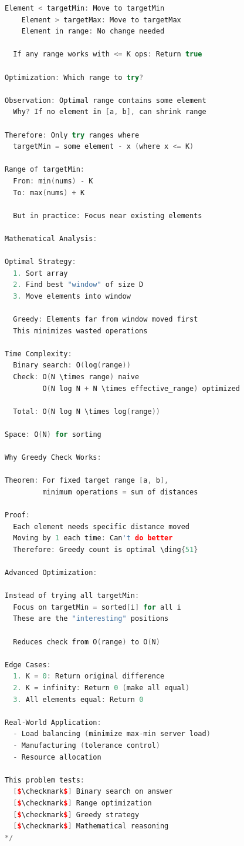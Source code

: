 \documentclass[11pt,a4paper,oneside]{book}
\begin{document}
\begin{lstlisting}[language=C++, caption=ELITE Problem 1 - Multi-Dimensional Binary Search]
    Element < targetMin: Move to targetMin
    Element > targetMax: Move to targetMax
    Element in range: No change needed
  
  If any range works with <= K ops: Return true

Optimization: Which range to try?

Observation: Optimal range contains some element
  Why? If no element in [a, b], can shrink range
  
Therefore: Only try ranges where
  targetMin = some element - x (where x <= K)

Range of targetMin:
  From: min(nums) - K
  To: max(nums) + K
  
  But in practice: Focus near existing elements

Mathematical Analysis:

Optimal Strategy:
  1. Sort array
  2. Find best "window" of size D
  3. Move elements into window
  
  Greedy: Elements far from window moved first
  This minimizes wasted operations

Time Complexity:
  Binary search: O(log(range))
  Check: O(N \times range) naive
         O(N log N + N \times effective_range) optimized
  
  Total: O(N log N \times log(range))

Space: O(N) for sorting

Why Greedy Check Works:

Theorem: For fixed target range [a, b],
         minimum operations = sum of distances

Proof:
  Each element needs specific distance moved
  Moving by 1 each time: Can't do better
  Therefore: Greedy count is optimal \ding{51}

Advanced Optimization:

Instead of trying all targetMin:
  Focus on targetMin = sorted[i] for all i
  These are the "interesting" positions
  
  Reduces check from O(range) to O(N)

Edge Cases:
  1. K = 0: Return original difference
  2. K = infinity: Return 0 (make all equal)
  3. All elements equal: Return 0

Real-World Application:
  - Load balancing (minimize max-min server load)
  - Manufacturing (tolerance control)
  - Resource allocation

This problem tests:
  [$\checkmark$] Binary search on answer
  [$\checkmark$] Range optimization
  [$\checkmark$] Greedy strategy
  [$\checkmark$] Mathematical reasoning
*/


\end{lstlisting}
\end{document}
